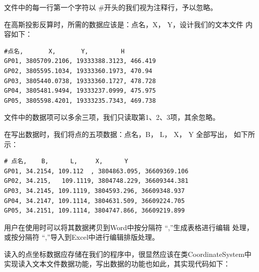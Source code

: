 文件中的每一行第一个字符以 \#开头的我们视为注释行，予以忽略。

在高斯投影反算时，所需的数据应该是：点名，X， Y，设计我们的文本文件
内容如下：

\begin{verbatim}
#点名,       X,       Y,         H
GP01, 3805709.2106, 19333388.3123, 466.419
GP02, 3805595.1034, 19333360.1973, 470.94
GP03, 3805440.0738, 19333360.1727, 478.728
GP04, 3805481.9494, 19333237.0999, 475.975
GP05, 3805598.4201, 19333235.7343, 469.738
\end{verbatim}

文件中的数据项可以多余三项，我们只读取第1、2、3项，其余忽略。

在写出数据时，我们将点的五项数据：点名，B， L， X， Y 全部写出，
如下所示：

\begin{verbatim}
# 点名,    B,      L,     X,      Y 
GP01, 34.2154, 109.112  , 3804863.095, 36609369.106
GP02, 34.215,   109.1119, 3804748.229, 36609344.381
GP03, 34.2145, 109.1119, 3804593.296, 36609348.937
GP04, 34.2147, 109.1114, 3804631.509, 36609224.705
GP05, 34.2151, 109.1114, 3804747.866, 36609219.899
\end{verbatim}

用户在使用时可以将其数据拷贝到Word中按分隔符 ``,''生成表格进行编辑
处理，或按分隔符 ``,''导入到Excel中进行编辑排版处理。

读入的点坐标数据应存储在我们的程序中，很显然应该在类CoordinateSystem中
实现读入文本文件数据功能，写出数据的功能也如此，其实现代码如下：

